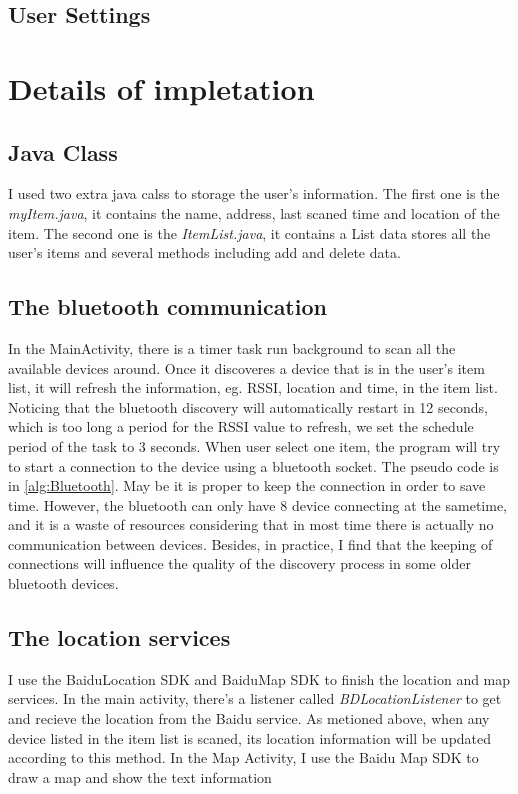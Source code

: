 \documentclass{article}
\begin{document}
\subsection{User Settings}

\section{Details of impletation}
\subsection{Java Class}
I used two extra java calss to storage the user's information. The first one is the \emph{myItem.java}, it contains the name, address, last scaned time and location of the item. The second one is the \emph{ItemList.java}, it contains a List data stores all the user's items and several methods including add and delete data.
\subsection{The bluetooth communication}
In the MainActivity, there is a timer task run background to scan all the available devices around. Once it discoveres a device that is in the user's item list, it will refresh the information, eg. RSSI, location and time, in the item list. Noticing that the bluetooth discovery will automatically restart in 12 seconds, which is too long a period for the RSSI value to refresh, we set the schedule period of the task to 3 seconds. When user select one item, the program will try to start a connection to the device using a bluetooth socket. The pseudo code is in \ref{alg:Bluetooth}.
May be it is proper to keep the connection in order to save time. However, the bluetooth can only have 8 device connecting at the sametime, and it is a waste of resources considering that in most time there is actually no communication between devices. Besides, in practice, I find that the keeping of connections will influence the quality of the discovery process in some older bluetooth devices. 
\subsection{The location services}
I use the BaiduLocation SDK and BaiduMap SDK to finish the location and map services. In the main activity, there's a listener called \emph{BDLocationListener} to get and recieve the location from the Baidu service. As metioned above, when any device listed in the item list is scaned, its location information will be updated according to this method. In the Map Activity, I use the Baidu Map SDK to draw a map and show the text information
\end{document}
